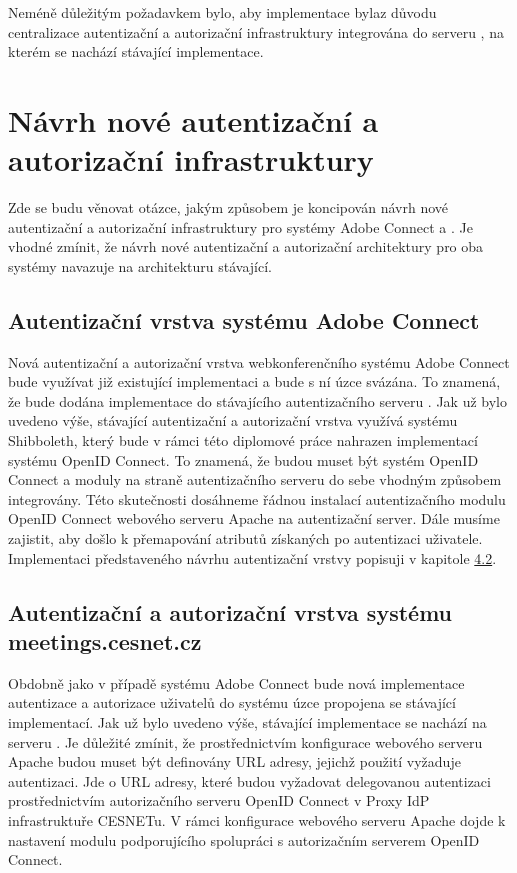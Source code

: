 \documentclass[
  printed, %
  twoside, %
  table,   %
  nolof,     %
  nolot,     %
]{fithesis3}
\begin{document}
\par

Neméně důležitým požadavkem bylo, aby implementace byla\break z důvodu centralizace autentizační a autorizační infrastruktury integrována do serveru , na kterém se nachází stávající implementace. 

\section{Návrh nové autentizační a autorizační infrastruktury}
Zde se budu věnovat otázce, jakým způsobem je koncipován návrh nové autentizační a autorizační infrastruktury pro systémy Adobe Connect a . Je vhodné zmínit, že návrh nové autentizační a autorizační architektury pro oba systémy navazuje na architekturu stávající. 

\subsection{Autentizační vrstva systému Adobe Connect}
Nová autentizační a autorizační vrstva webkonferenčního systému Adobe Connect bude využívat již existující implementaci a bude s ní úzce svázána. To znamená, že bude dodána implementace do stávajícího autentizačního serveru . Jak už bylo uvedeno výše, stávající autentizační a autorizační vrstva využívá systému Shibboleth, který bude v rámci této diplomové práce nahrazen implementací systému OpenID Connect. To znamená, že budou muset být systém OpenID Connect a moduly na straně autentizačního serveru  do sebe vhodným způsobem integrovány. Této skutečnosti dosáhneme řádnou instalací autentizačního modulu OpenID Connect webového serveru Apache na autentizační server. Dále musíme zajistit, aby došlo k přemapování atributů získaných po autentizaci uživatele. Implementaci představeného návrhu autentizační vrstvy popisuji v kapitole \hyperref[ACImpl]{4.2}. 

\subsection{Autentizační a autorizační vrstva systému meetings.cesnet.cz}
\label{shong-proposal}
Obdobně jako v případě systému Adobe Connect bude nová implementace autentizace a autorizace uživatelů do systému  úzce propojena se stávající implementací. Jak už bylo uvedeno výše, stávající implementace se nachází na serveru . Je důležité zmínit, že prostřednictvím konfigurace webového serveru Apache budou muset být definovány URL adresy, jejichž použití vyžaduje autentizaci. Jde o URL adresy, které budou vyžadovat delegovanou autentizaci prostřednictvím autorizačního serveru OpenID Connect v Proxy IdP infrastruktuře CESNETu. V rámci konfigurace webového serveru Apache dojde k nastavení modulu podporujícího spolupráci s autorizačním serverem OpenID Connect.  \par
\end{document}
